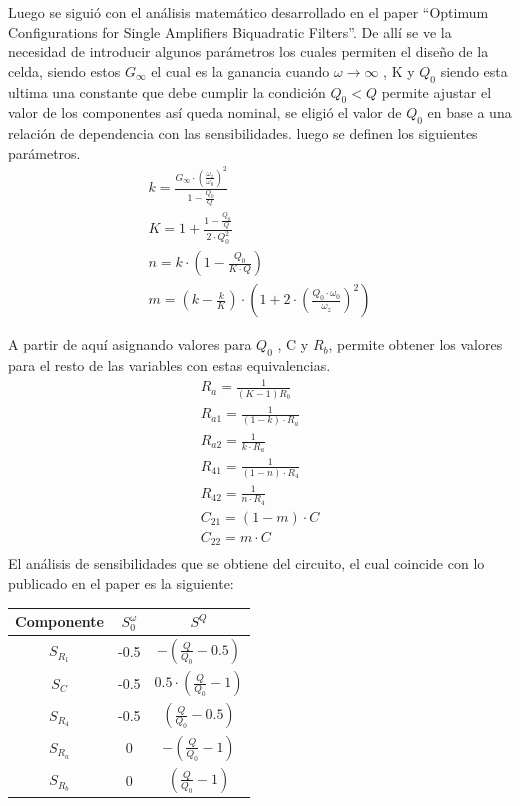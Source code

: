 Luego se siguió con el análisis matemático desarrollado en el paper ``Optimum Configurations for Single Amplifiers Biquadratic Filters''.
De allí se ve la necesidad de introducir algunos parámetros los cuales permiten el diseño de la celda, siendo estos $G_\infty$ el cual es la ganancia cuando $\omega \rightarrow \infty$ , K y $Q_0$ siendo esta ultima una constante que debe cumplir la condición $Q_0 < Q$ permite ajustar el valor de los componentes así queda nominal, se eligió el valor de $Q_0$ en base a una relación de dependencia con las sensibilidades.  luego se definen los siguientes parámetros. 
\begin{align}
k=\frac{G_\infty\cdot \left(\frac{\omega_z}{\omega_0} \right)^2}{1-\frac{Q_0}{Q}}\\
K=1+\frac{1-\frac{Q_0}{Q}}{2\cdot Q_0^2}\\
n= k\cdot (1-\frac{Q_0 }{K\cdot Q})\\
m=  \left( k-\frac{k}{K} \right) \cdot \left(1+2\cdot \left(\frac{Q_0\cdot \omega_0}{\omega_z}\right)^2 \right)  
\end{align}

A partir de aquí asignando valores para $Q_0$ , C y $R_b$, permite obtener los valores para el resto de las variables con estas equivalencias.  
\begin{align}
	R_a= \frac{1}{(K-1) R_b}\\
	R_{a1}=\frac{1}{(1-k)\cdot R_a}\\
	R_{a2}=\frac{1}{k \cdot R_a}\\
	R_{41}=	\frac{1}{(1-n)\cdot R_4}\\
	R_{42}=	\frac{1}{n\cdot R_4}\\
	C_{21} = (1-m) \cdot C\\
	C_{22} = m \cdot C\\
\end{align}
El análisis de sensibilidades que se obtiene del circuito, el cual coincide con lo publicado en el paper es la siguiente: 
\begin{table}[H]
\centering
\begin{tabular}{ccc}
Componente & $S^\omega_0$ & $S^Q$                                      \\ \hline
$S_{R_1}$  & -0.5         & $-\left( \frac{Q}{Q_0} -0.5 \right)$       \\
$S_{C}$    & -0.5         & $0.5\cdot \left( \frac{Q}{Q_0} -1 \right)$ \\
$S_{R_4}$  & -0.5         & $\left( \frac{Q}{Q_0} -0.5 \right)$        \\
$S_{R_a}$  & 0            & $-\left( \frac{Q}{Q_0} -1 \right)$         \\
$S_{R_b}$  & 0            & $\left( \frac{Q}{Q_0} -1 \right)$         
\end{tabular}
\end{table}


